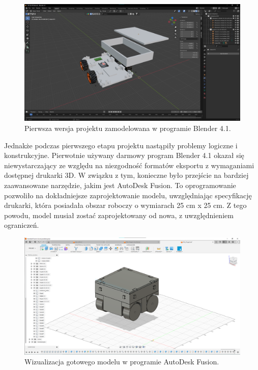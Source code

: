 \documentclass{report}
\begin{document}
\begin{figure}[H]
    \centering
    \includegraphics*[width=1.0\textwidth]{"src/Robot_pics/blender.png"}
    \caption{Pierwsza wersja projektu zamodelowana w programie Blender 4.1.}
    \label{fig:bt_con_arduino}
\end{figure}

Jednakże podczas pierwszego etapu projektu nastąpiły problemy logiczne i konstrukcyjne. Pierwotnie używany darmowy program Blender 4.1 okazał się niewystarczający ze względu na niezgodność formatów eksportu z wymaganiami dostępnej drukarki 3D. 
W związku z tym, konieczne było przejście na bardziej zaawansowane narzędzie, jakim jest AutoDesk Fusion. To oprogramowanie pozwoliło na dokładniejsze zaprojektowanie modelu, uwzględniając specyfikację drukarki, która posiadała obszar roboczy o wymiarach 25 cm x 25 cm. 
Z tego powodu, model musiał zostać zaprojektowany od nowa, z uwzględnieniem ograniczeń.

\begin{figure}[H]
    \centering
    \includegraphics*[width=1.0\textwidth]{"src/Robot_pics/Fusion 1.png"}
    \caption{Wizualizacja gotowego modelu w programie AutoDesk Fusion.}
    \label{fig:bt_con_arduino}
\end{figure}
\end{document}
